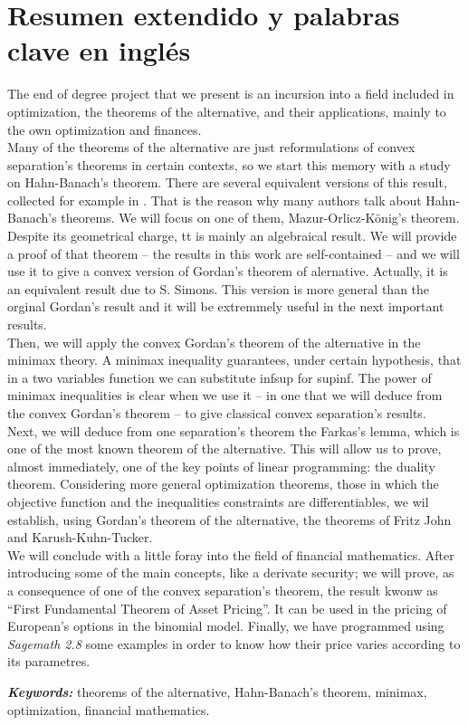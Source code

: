 \chapter{Resumen extendido y palabras clave en inglés}
The end of degree project that we present is an incursion into a field included in optimization, the theorems of the alternative, and their applications, mainly to the own optimization and finances.\\

Many of the theorems of the alternative are just reformulations of convex separation's theorems in certain contexts, so we start this memory with a study on Hahn-Banach's theorem. There are several equivalent versions of this result, collected for example in \cite{schechter1996handbook}. That is the reason why many authors talk about Hahn-Banach's theorems. We will focus on one of them, Mazur-Orlicz-König's theorem. Despite its geometrical charge, tt is mainly an algebraical result. We will provide a proof of that theorem -- the results in this work are self-contained --  and we will use it to give a convex version  of Gordan's theorem of alernative. Actually, it is an equivalent result due to S. Simons. This version is more general than the orginal Gordan's result and it will be extremmely useful in the next important results. \\

Then, we will apply the convex Gordan's theorem of the alternative in the minimax theory. A minimax inequality guarantees, under certain hypothesis, that in a two variables function we can substitute inf\hspace{0.5mm}sup for sup\hspace{0.5mm}inf. The power of minimax inequalities is clear when we use it -- in one that we will deduce from the convex Gordan's theorem -- to give classical convex separation's results. \\

Next, we will deduce from one separation's theorem the Farkas's lemma, which is one of the most known theorem of the alternative. This will allow us to prove, almost immediately, one of the key points of linear programming: the duality theorem. Considering more general optimization theorems, those in which the objective function and the inequalities constraints are differentiables, we wil establish, using Gordan's theorem of the alternative, the theorems of Fritz John and Karush-Kuhn-Tucker.\\

We will conclude with a little foray into the field of financial mathematics. After introducing some of the main concepts, like a derivate security; we will prove, as a consequence of one of the convex separation's theorem, the result kwonw as ``First Fundamental Theorem of Asset Pricing''. It can be used in the pricing of European's options in the binomial model. Finally, we have programmed using \textit{Sagemath 2.8} some examples in order to know how their price varies according to its parametres.\\

\providecommand{\keywords}[1]
{
	\small	
	\textbf{\textit{Keywords: }} #1
}
\keywords{theorems of the alternative, Hahn-Banach's theorem, minimax, optimization, financial mathematics.}